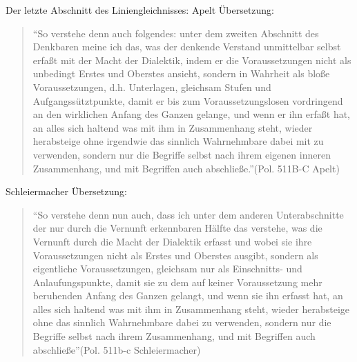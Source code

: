\documentclass[12pt]{article}
\newcommand*{\zitatblock}[1]{%
    \begin{quote}
    \fontsize{10}{12}\selectfont
    \setlength{\parskip}{1.0em}
    #1
    \end{quote}
}
\begin{document}
Der letzte Abschnitt des Liniengleichnisses: 
Apelt Übersetzung: \zitatblock{\enquote{So verstehe denn auch folgendes: unter dem zweiten Abschnitt des Denkbaren meine ich das, was der denkende Verstand unmittelbar selbst erfaßt mit der Macht der Dialektik, indem er die Voraussetzungen nicht als unbedingt Erstes und Oberstes ansieht, sondern in Wahrheit als bloße Voraussetzungen, d.h. Unterlagen, gleichsam Stufen und Aufgangssütztpunkte, damit er bis zum Voraussetzungslosen vordringend an den wirklichen Anfang des Ganzen gelange, und wenn er ihn erfaßt hat, an alles sich haltend was mit ihm in Zusammenhang steht, wieder herabsteige ohne irgendwie das sinnlich Wahrnehmbare dabei mit zu verwenden, sondern nur die Begriffe selbst nach ihrem eigenen inneren Zusammenhang, und mit Begriffen auch abschließe.}(Pol. 511B-C Apelt)}\nocite{PoliteiaApelt}
Schleiermacher Übersetzung:\zitatblock{\enquote{So verstehe denn nun auch, dass ich unter dem anderen Unterabschnitte der nur durch die Vernunft erkennbaren Hälfte das verstehe, was die Vernunft durch die Macht der Dialektik erfasst und wobei sie ihre Voraussetzungen nicht als Erstes und Oberstes ausgibt, sondern als eigentliche Voraussetzungen, gleichsam nur als Einschnitts- und Anlaufungspunkte, damit sie zu dem auf keiner Voraussetzung mehr beruhenden Anfang des Ganzen gelangt, und wenn sie ihn erfasst hat, an alles sich haltend was mit ihm in Zusammenhang steht, wieder herabsteige ohne das sinnlich Wahrnehmbare dabei zu verwenden, sondern nur die Begriffe selbst nach ihrem Zusammenhang, und mit Begriffen auch abschließe}(Pol. 511b-c Schleiermacher)}
\end{document}
